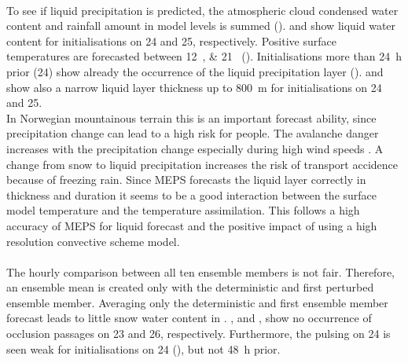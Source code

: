 \\
To see if liquid precipitation is predicted, the atmospheric cloud condensed water content and rainfall amount in model levels is summed ().  and  show liquid water content for initialisations on \SI{24}{\dec} and \SI{25}{\dec}, respectively. Positive surface temperatures are forecasted between \SIlist{12;21}{\UTC} (). Initialisations more than \SI{24}{\hour} prior (\SI{24}{\dec}) show already the occurrence of the liquid precipitation layer ().  and  show also a narrow liquid layer thickness up to \SI{800}{\metre} for initialisations on \num{24} and \SI{25}{\dec}. 
\\
In Norwegian mountainous terrain this is an important forecast ability, since precipitation change can lead to a high risk for people. The avalanche danger increases with the precipitation change especially during high wind speeds \citep{hansen_warmer_2014}. A change from snow to liquid precipitation increases the risk of transport accidence because of freezing rain.
Since MEPS forecasts the liquid layer correctly in thickness and duration it seems to be a good interaction between the surface model temperature and the temperature assimilation. This follows a high accuracy of MEPS for liquid forecast and the positive impact of using a high resolution convective scheme model.
\\
\\
The hourly comparison between all ten ensemble members is not fair. Therefore, an ensemble mean is created only with the deterministic and first perturbed ensemble member. Averaging only the deterministic and first ensemble member forecast leads to little snow water content in . ,  and ,  show no occurrence of occlusion passages on \num{23} and \SI{26}{\dec}, respectively. Furthermore, the pulsing on \SI{24}{\dec} is seen weak for initialisations on \SI{24}{\dec} (), but not \SI{48}{\hour} prior.
